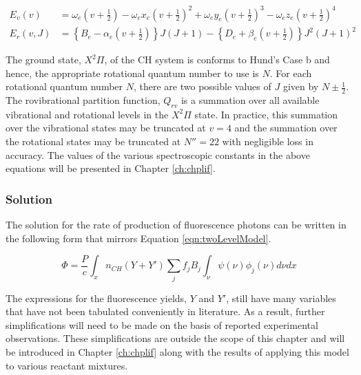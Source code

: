 \begin{align}
  E_v(v) &= \omega_e \left(v+\frac{1}{2}\right) - \omega_ex_e \left(v+\frac{1}{2}\right)^2 + \omega_ey_e \left(v+\frac{1}{2}\right)^3 - \omega_ez_e \left(v+\frac{1}{2}\right)^4
  \label{eqn:vibrationalEnergy}\\
  E_r(v, J) &= \left\{B_e - \alpha_e \left(v+\frac{1}{2}\right)\right\}J(J+1) - \left\{D_e + \beta_e \left(v+\frac{1}{2}\right)\right\}J^2(J+1)^2
  \label{eqn:rotationalEnergy}
\end{align}

The ground state, \(X^2\Pi\), of the CH system is conforms to Hund's Case b\cite{1987-bernath} and hence, the appropriate rotational quantum number to use is \(N\).
For each rotational quantum number \(N\), there are two possible values of \(J\) given by \(N \pm \frac{1}{2}\).
The rovibrational partition function, \(Q_{rv}\) is a summation over all available vibrational and rotational levels in the \(X^2\Pi\) state.
In practice, this summation over the vibrational states may be truncated at \(v=4\) and the summation over the rotational states may be truncated at \(N''=22\) with negligible loss in accuracy.
The values of the various spectroscopic constants in the above equations will be presented in Chapter \ref{ch:chplif}.

\subsubsection{Solution}
\label{subsubsec:improved-model-solution}

The solution for the rate of production of fluorescence photons can be written in the following form that mirrors Equation \ref{eqn:twoLevelModel}.

\begin{equation}
  \Phi = \frac{P}{c} \int_x n_{CH} (Y + Y') \sum_j f_j B_j \int_\nu \psi(\nu) \phi_j(\nu) d\nu dx
  \label{eqn:improvedModel}
\end{equation}

The expressions for the fluorescence yields, \(Y\) and \(Y'\), still have many variables that have not been tabulated conveniently in literature.
As a result, further simplifications will need to be made on the basis of reported experimental observations.
These simplifications are outside the scope of this chapter and will be introduced in Chapter \ref{ch:chplif} along with the results of applying this model to various reactant mixtures.

